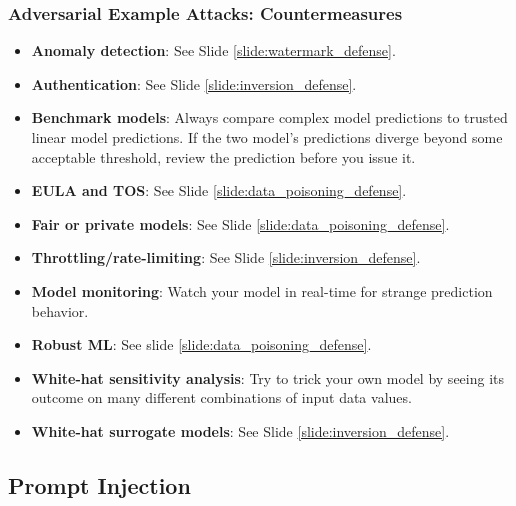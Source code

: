 \documentclass[11pt,
               aspectratio=169,
               hyperref={colorlinks}
               ]{beamer}
\begin{document}
			\begin{frame}
		
				\frametitle{Adversarial Example Attacks: \textbf{Countermeasures}}		
				\footnotesize
				\begin{itemize}
					\item \textbf{Anomaly detection}: See Slide \ref{slide:watermark_defense}. 
					\item \textbf{Authentication}: See Slide \ref{slide:inversion_defense}. 
					\item \textbf{Benchmark models}: Always compare complex model predictions to trusted linear model predictions. If the two model’s predictions diverge beyond some acceptable threshold, review the prediction before you issue it.
					\item \textbf{EULA and TOS}: See Slide \ref{slide:data_poisoning_defense}.
					\item \textbf{Fair or private models}: See Slide \ref{slide:data_poisoning_defense}.
					\item \textbf{Throttling/rate-limiting}: See Slide \ref{slide:inversion_defense}. 
					\item \textbf{Model monitoring}: Watch your model in real-time for strange prediction behavior.
					\item \textbf{Robust ML}: See slide \ref{slide:data_poisoning_defense}.
					\item \textbf{White-hat sensitivity analysis}: Try to trick your own model by seeing its outcome on many different combinations of input data values.
					\item \textbf{White-hat surrogate models}: See Slide \ref{slide:inversion_defense}. 
				\end{itemize}
				\normalsize
			\end{frame}

		\subsection{Prompt Injection}
\end{document}
